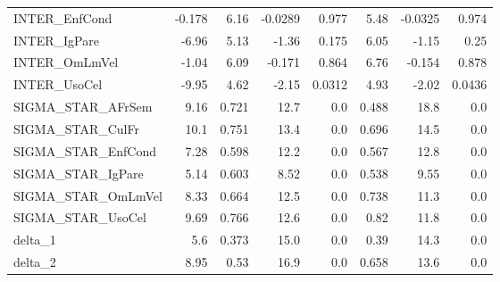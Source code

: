 \begin{tabular}{lrrrrrrr}
INTER\_EnfCond      & -0.178 &     6.16 & -0.0289 &    0.977 &          5.48 &      -0.0325 &         0.974 \\
INTER\_IgPare       &  -6.96 &     5.13 &   -1.36 &    0.175 &          6.05 &        -1.15 &          0.25 \\
INTER\_OmLmVel      &  -1.04 &     6.09 &  -0.171 &    0.864 &          6.76 &       -0.154 &         0.878 \\
INTER\_UsoCel       &  -9.95 &     4.62 &   -2.15 &   0.0312 &          4.93 &        -2.02 &        0.0436 \\
SIGMA\_STAR\_AFrSem  &   9.16 &    0.721 &    12.7 &      0.0 &         0.488 &         18.8 &           0.0 \\
SIGMA\_STAR\_CulFr   &   10.1 &    0.751 &    13.4 &      0.0 &         0.696 &         14.5 &           0.0 \\
SIGMA\_STAR\_EnfCond &   7.28 &    0.598 &    12.2 &      0.0 &         0.567 &         12.8 &           0.0 \\
SIGMA\_STAR\_IgPare  &   5.14 &    0.603 &    8.52 &      0.0 &         0.538 &         9.55 &           0.0 \\
SIGMA\_STAR\_OmLmVel &   8.33 &    0.664 &    12.5 &      0.0 &         0.738 &         11.3 &           0.0 \\
SIGMA\_STAR\_UsoCel  &   9.69 &    0.766 &    12.6 &      0.0 &          0.82 &         11.8 &           0.0 \\
delta\_1            &    5.6 &    0.373 &    15.0 &      0.0 &          0.39 &         14.3 &           0.0 \\
delta\_2            &   8.95 &     0.53 &    16.9 &      0.0 &         0.658 &         13.6 &           0.0 \\
\bottomrule
\end{tabular}

